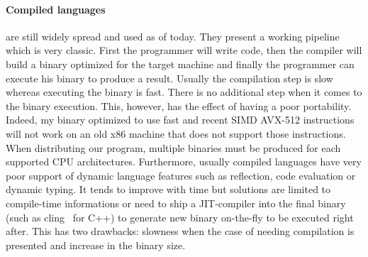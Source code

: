 \paragraph{Compiled languages} are still widely spread and used as of today. They present a working pipeline which is
very classic. First the programmer will write code, then the compiler will build a binary optimized for the target
machine and finally the programmer can execute his binary to produce a result. Usually the compilation step is slow
whereas executing the binary is fast. There is no additional step when it comes to the binary execution. This, however,
has the effect of having a poor portability. Indeed, my binary optimized to use fast and recent SIMD AVX-512
instructions will not work on an old x86 machine that does not support those instructions. When distributing our
program, multiple binaries must be produced for each supported CPU architectures. Furthermore, usually compiled
languages have very poor support of dynamic language features such as reflection, code evaluation or dynamic typing. It
tends to improve with time but solutions are limited to compile-time informations or need to ship a JIT-compiler into
the final binary (such as cling~\parencite{vassilev.2012.cling} for C++) to generate new binary on-the-fly to be
executed right after. This has two drawbacks: slowness when the case of needing compilation is presented and increase in
the binary size.

